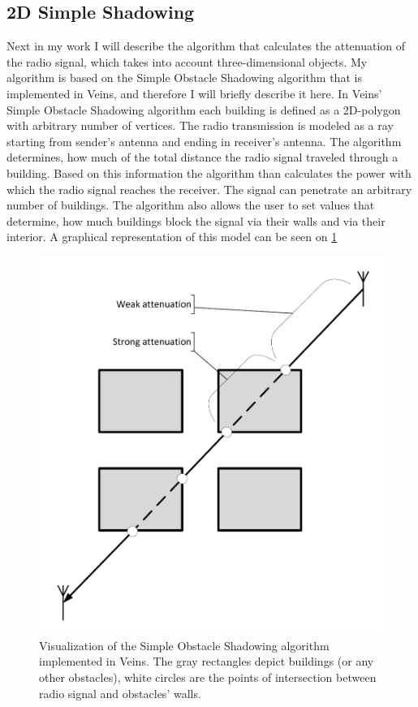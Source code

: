 \documentclass[]{nsm-thesis}
\begin{document}
\subsection{2D Simple Shadowing}

Next in my work I will describe the algorithm that calculates the attenuation of the radio signal, which takes into account three-dimensional objects. My algorithm is based on the Simple Obstacle Shadowing algorithm \cite{SimpleObstacleShadowing} that is implemented in Veins, and therefore I will briefly describe it here. In Veins' Simple Obstacle Shadowing algorithm each building is defined as a 2D-polygon with arbitrary number of vertices. The radio transmission is modeled as a ray starting from sender's antenna and ending in receiver's antenna. The algorithm determines, how much of the total distance the radio signal traveled through a building. Based on this information the algorithm than calculates the power with which the radio signal reaches the receiver. The signal can penetrate an arbitrary number of buildings. The algorithm also allows the user to set values that determine, how much buildings block the signal via their walls and via their interior. A graphical representation of this model can be seen on \cref{fig:SimpleObstacleShadowing}

\begin{figure}
	\centering
	\includegraphics[width=1\textwidth]{figures/SimpleObstacleShadowing.pdf}
	\caption{Visualization of the Simple Obstacle Shadowing algorithm implemented in Veins. The gray rectangles depict buildings (or any other obstacles), white circles are the points of intersection between radio signal and obstacles' walls.}
	\label{fig:SimpleObstacleShadowing}
\end{figure}
\end{document}

